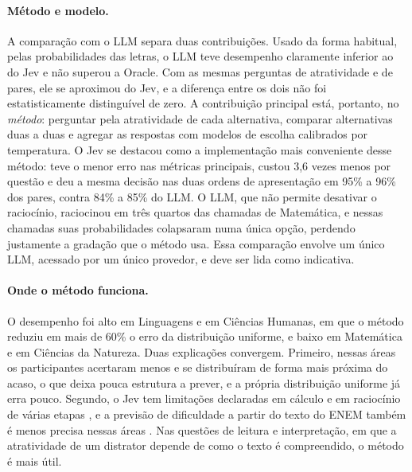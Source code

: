 \paragraph{Método e modelo.} A comparação com o LLM separa duas contribuições. Usado da forma habitual, pelas probabilidades das letras, o LLM teve desempenho claramente inferior ao do Jev e não superou a Oracle. Com as mesmas perguntas de atratividade e de pares, ele se aproximou do Jev, e a diferença entre os dois não foi estatisticamente distinguível de zero. A contribuição principal está, portanto, no \emph{método}: perguntar pela atratividade de cada alternativa, comparar alternativas duas a duas e agregar as respostas com modelos de escolha calibrados por temperatura. O Jev se destacou como a implementação mais conveniente desse método: teve o menor erro nas métricas principais, custou 3,6 vezes menos por questão e deu a mesma decisão nas duas ordens de apresentação em 95\% a 96\% dos pares, contra 84\% a 85\% do LLM. O LLM, que não permite desativar o raciocínio, raciocinou em três quartos das chamadas de Matemática, e nessas chamadas suas probabilidades colapsaram numa única opção, perdendo justamente a gradação que o método usa. Essa comparação envolve um único LLM, acessado por um único provedor, e deve ser lida como indicativa.

\paragraph{Onde o método funciona.} O desempenho foi alto em Linguagens e em Ciências Humanas, em que o método reduziu em mais de 60\% o erro da distribuição uniforme, e baixo em Matemática e em Ciências da Natureza. Duas explicações convergem. Primeiro, nessas áreas os participantes acertaram menos e se distribuíram de forma mais próxima do acaso, o que deixa pouca estrutura a prever, e a própria distribuição uniforme já erra pouco. Segundo, o Jev tem limitações declaradas em cálculo e em raciocínio de várias etapas \citep{typesafe2026jaggedness,li2026}, e a previsão de dificuldade a partir do texto do ENEM também é menos precisa nessas áreas \citep{marinho2023}. Nas questões de leitura e interpretação, em que a atratividade de um distrator depende de como o texto é compreendido, o método é mais útil.

